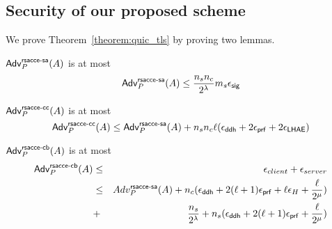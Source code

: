 \subsection{Security of our proposed scheme} \label{sec:quic_proof}

We prove Theorem~\ref{theorem:quic_tls} by proving two lemmas.

\begin{lemma} \label{lemma:proposed_scheme_rsacce-sa}
 $\mathsf{Adv}^{\mathsf{rsacce\textsc{-} sa}}_{P}(A)$ is at most
 \begin{equation}
  \mathsf{Adv}^{\mathsf{rsacce\textsc{-} sa}}_{P}(A) \leq \frac{n_s n_c}{2^{\lambda}} m_s \epsilon_{\mathsf{sig}}
 \end{equation}
\end{lemma}
%


\begin{lemma} \label{lemma:proposed_scheme_rsacce-cc}
 $\mathsf{Adv}^{\mathsf{rsacce\textsc{-} cc}}_{P}(A)$ is at most
 \begin{equation}
  \mathsf{Adv}^{\mathsf{rsacce\textsc{-} cc}}_{P}(A) \leq \mathsf{Adv}^{\mathsf{rsacce\textsc{-} sa}}_{P}(A) + n_sn_c\ell(\epsilon_{\mathsf{ddh}} + 2\epsilon_{\mathsf{prf}} + 2\epsilon_{\mathsf{LHAE}})
 \end{equation}
\end{lemma}
%


\begin{lemma} \label{lemma:proposed_scheme_tls_rsacce-cb}
 $\mathsf{Adv}^{\mathsf{rsacce\textsc{-} cb}}_{P}(A)$ is at most
 \begin{eqnarray}
  \mathsf{Adv}^{\mathsf{rsacce\textsc{-} cb}}_{P}(A) &\leq& \epsilon_{client} + \epsilon_{server} \nonumber \\
  &\leq& Adv^{\mathsf{rsacce\textsc{-} sa}}_{P}(A) + n_c(\epsilon_{\mathsf{ddh}} + 2(\ell + 1)\epsilon_{\mathsf{prf}} + \ell\epsilon_{H} + \frac{\ell}{2^{\mu}}) \nonumber \\
   &+& \frac{n_s}{2^{\lambda}} + n_s(\epsilon_{\mathsf{ddh}} + 2(\ell+1)\epsilon_{\mathsf{prf}} + \frac{\ell}{2^{\mu}})
 \end{eqnarray}
\end{lemma}
%
